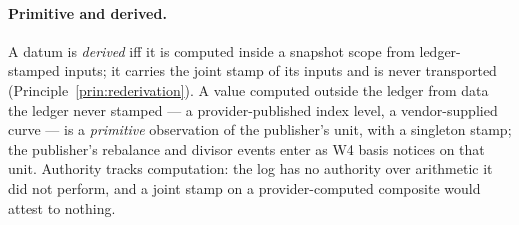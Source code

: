 \documentclass[11pt,a4paper]{article}
\begin{document}
\paragraph{Primitive and derived.} A datum is \emph{derived} iff it is computed
inside a snapshot scope from ledger-stamped inputs; it carries the joint stamp of
its inputs and is never transported (Principle~\ref{prin:rederivation}). A value
computed outside the ledger from data the ledger never stamped --- a
provider-published index level, a vendor-supplied curve --- is a \emph{primitive}
observation of the publisher's unit, with a singleton stamp; the publisher's
rebalance and divisor events enter as W4 basis notices on that unit. Authority
tracks computation: the log has no authority over arithmetic it did not perform, and
a joint stamp on a provider-computed composite would attest to nothing.
\end{document}

